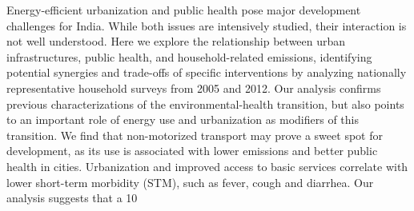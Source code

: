 Energy-efficient urbanization and public health pose major development challenges for India. While both issues are intensively studied, their interaction is not well understood. Here we explore the relationship between urban infrastructures, public health, and household-related emissions, identifying potential synergies and trade-offs of specific interventions by analyzing nationally representative household surveys from 2005 and 2012. Our analysis confirms previous characterizations of the environmental-health transition, but also points to an important role of energy use and urbanization as modifiers of this transition. We find that non-motorized transport may prove a sweet spot for development, as its use is associated with lower emissions and better public health in cities. Urbanization and improved access to basic services correlate with lower short-term morbidity (STM), such as fever, cough and diarrhea. Our analysis suggests that a 10%